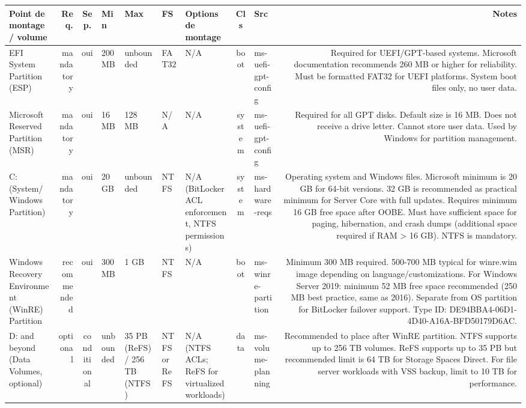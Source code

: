 \documentclass[10pt,a4paper]{article}
\renewcommand{\arraystretch}{1.2}
\begin{document}
{\renewcommand{\arraystretch}{1.15}\begin{longtable}{M R S Z Z T O C I N}\toprule\textbf{\normalfont\scriptsize Point de montage / volume} & \textbf{\normalfont\scriptsize Req.} & \textbf{\normalfont\scriptsize Sep.} & \textbf{\normalfont\scriptsize Min} & \textbf{\normalfont\scriptsize Max} & \textbf{\normalfont\scriptsize FS} & \textbf{\normalfont\scriptsize Options de montage} & \textbf{\normalfont\scriptsize Cls} & \textbf{\normalfont\scriptsize Src} & \textbf{\normalfont\scriptsize Notes}\\\midrule\endhead
EFI System Partition (ESP) & \textcolor{cBlock}{mandatory} & \textcolor{cOk}{oui} & 200 MB & unbounded & FAT32 & N/A & boot & ms-uefi-gpt-config & Required for UEFI/GPT-based systems. Microsoft documentation recommends 260 MB or higher for reliability. Must be formatted FAT32 for UEFI platforms. System boot files only, no user data.\\
Microsoft Reserved Partition (MSR) & \textcolor{cBlock}{mandatory} & \textcolor{cOk}{oui} & 16 MB & 128 MB & N/A & N/A & system & ms-uefi-gpt-config & Required for all GPT disks. Default size is 16 MB. Does not receive a drive letter. Cannot store user data. Used by Windows for partition management.\\
C: (System/Windows Partition) & \textcolor{cBlock}{mandatory} & \textcolor{cOk}{oui} & 20 GB & unbounded & NTFS & N/A (BitLocker ACL enforcement, NTFS permissions) & system & ms-hardware-reqs & Operating system and Windows files. Microsoft minimum is 20 GB for 64-bit versions. 32 GB is recommended as practical minimum for Server Core with full updates. Requires minimum 16 GB free space after OOBE. Must have sufficient space for paging, hibernation, and crash dumps (additional space required if RAM > 16 GB). NTFS is mandatory.\\
Windows Recovery Environment (WinRE) Partition & \textcolor{cHigh}{recommended} & \textcolor{cOk}{oui} & 300 MB & 1 GB & NTFS & N/A & boot & ms-winre-partition & Minimum 300 MB required. 500-700 MB typical for winre.wim image depending on language/customizations. For Windows Server 2019: minimum 52 MB free space recommended (250 MB best practice, same as 2016). Separate from OS partition for BitLocker failover support. Type ID: DE94BBA4-06D1-4D40-A16A-BFD50179D6AC.\\
D: and beyond (Data Volumes, optional) & \textcolor{cLow}{optional} & conditional & unbounded & 35 PB (ReFS) / 256 TB (NTFS) & NTFS or ReFS & N/A (NTFS ACLs; ReFS for virtualized workloads) & data & ms-volume-planning & Recommended to place after WinRE partition. NTFS supports up to 256 TB volumes. ReFS supports up to 35 PB but recommended limit is 64 TB for Storage Spaces Direct. For file server workloads with VSS backup, limit to 10 TB for performance.\\
\bottomrule\end{longtable}}
\end{document}

